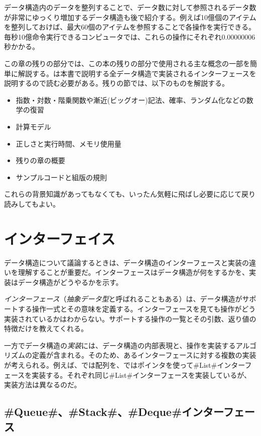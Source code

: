 データ構造内のデータを整列することで、データ数に対して参照されるデータ数が非常にゆっくり増加するデータ構造も後で紹介する。例えば10億個のアイテムを整列しておけば、最大60個のアイテムを参照することで各操作を実行できる。毎秒10億命令実行できるコンピュータでは、これらの操作にそれぞれ$0.00000006$秒かかる。

この章の残りの部分では、この本の残りの部分で使用される主な概念の一部を簡単に解説する。は本書で説明する全データ構造で実装されるインターフェースを説明するので読む必要がある。残りの節では、以下のものを解説する。
\begin{itemize}
\item 指数・対数・階乗関数や漸近(ビッグオー)記法、確率、ランダム化などの数学の復習
\item 計算モデル
\item 正しさと実行時間、メモリ使用量
\item 残りの章の概要
\item サンプルコードと組版の規則
\end{itemize}
これらの背景知識があってもなくても、いったん気軽に飛ばし必要に応じて戻り読みしてもよい。

\section{インターフェイス}
データ構造について議論するときは、データ構造のインターフェースと実装の違いを理解することが重要だ。インターフェースはデータ構造が何をするかを、実装はデータ構造がどうやるかを示す。

\emph{インターフェース}（\emph{抽象データ型}と呼ばれることもある）は、データ構造がサポートする操作一式とその意味を定義する。インターフェースを見ても操作がどう実装されているかはわからない。サポートする操作の一覧とその引数、返り値の特徴だけを教えてくれる。

一方でデータ構造の\emph{実装}には、データ構造の内部表現と、操作を実装するアルゴリズムの定義が含まれる。そのため、あるインターフェースに対する複数の実装が考えられる。例えば、では配列を、ではポインタを使って#List#インターフェースを実装する。それぞれ同じ#List#インターフェースを実装しているが、実装方法は異なるのだ。

\subsection{#Queue#、#Stack#、#Deque#インターフェース}

